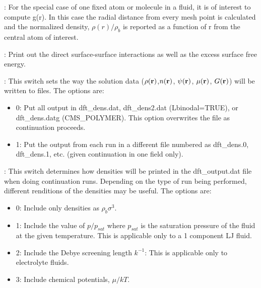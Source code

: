 \documentclass[10pt,onecolumn]{article}
\begin{document}
\vspace{0.1in}
: For the special case of one fixed atom or
molecule in a fluid, it is of interest to compute g(r).  In this case
the radial distance from every mesh point is calculated and the normalized
density, $\rho(r)/\rho_b$ is reported as a function of r from the central atom
of interest.

\vspace{0.1in}
: Print out the direct surface-surface interactions as well as the excess surface free energy.

\vspace{0.1in}
:  This switch sets the way the
solution data ($\rho({\bf r})$,$n({\bf r})$, $\psi({\bf r})$,
$\mu({\bf r})$, $G({\bf r})$) will be written to files.  The options are:

\begin{itemize}
\item 0: Put all output in dft\_dens.dat, dft\_dens2.dat
(Lbinodal=TRUE), or dft\_dens.datg (CMS\_POLYMER).  This option
overwrites the file as continuation proceeds.

\item 1: Put the output from each run in a different file
numbered as dft\_dens.0, dft\_dens.1, etc. (given continuation
in one field only).
\end{itemize}

\vspace{0.1in}
:  This switch determines how densities
will be printed in the dft\_output.dat file when doing continuation runs.  Depending on the type of
run being performed, different renditions of the densities may be useful.
The options are:

\begin{itemize}
\item 0: Include only densities as $\rho_b \sigma^3$.

\item 1: Include the value of $p/p_{sat}$ where $p_{sat}$
is the saturation pressure of the fluid at the given temperature.
This is applicable only to a 1 component LJ fluid.

\item 2: Include the Debye screening length $k^{-1}$: This is applicable
only to electrolyte fluids.

\item 3: Include chemical potentials, $\mu/kT$.
\end{itemize}
\end{document}
